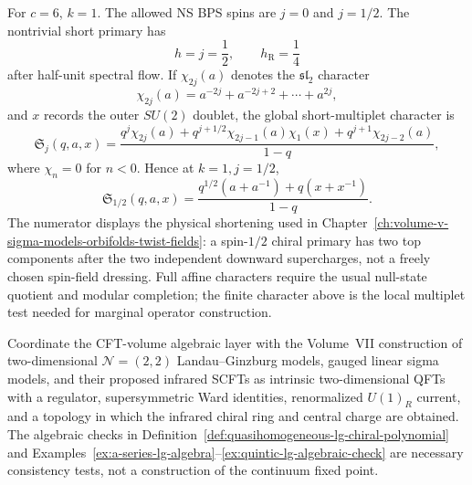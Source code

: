 \begin{example}[\(c=6\) short multiplet character]
\label{ex:small-n4-c6-short-character}
For \(c=6\), \(k=1\).  The allowed NS BPS spins are \(j=0\) and
\(j=1/2\).  The nontrivial short primary has
\[
  h=j=\frac12,
  \qquad
  h_{\mathrm R}=\frac14
\]
after half-unit spectral flow.  If \(\chi_{2j}(a)\) denotes the
\(\mathfrak{sl}_2\) character
\[
  \chi_{2j}(a)=a^{-2j}+a^{-2j+2}+\cdots+a^{2j},
\]
and \(x\) records the outer \(SU(2)\) doublet, the global short-multiplet
character is
\begin{equation}
  \mathfrak S_j(q,a,x)
  =
  \frac{
    q^j\chi_{2j}(a)
    +q^{j+1/2}\chi_{2j-1}(a)\chi_1(x)
    +q^{j+1}\chi_{2j-2}(a)
  }{1-q},
  \label{eq:small-n4-global-short-character}
\end{equation}
where \(\chi_n=0\) for \(n<0\).  Hence at \(k=1,j=1/2\),
\begin{equation}
  \mathfrak S_{1/2}(q,a,x)
  =
  \frac{
    q^{1/2}(a+a^{-1})+q(x+x^{-1})
  }{1-q}.
  \label{eq:small-n4-c6-jhalf-character}
\end{equation}
The numerator displays the physical shortening used in
Chapter~\ref{ch:volume-v-sigma-models-orbifolds-twist-fields}: a
spin-\(1/2\) chiral primary has two top components after the two independent
downward supercharges, not a freely chosen spin-field dressing.  Full affine
characters require the usual null-state quotient and modular completion; the
finite character above is the local multiplet test needed for marginal
operator construction.
\end{example}

\begin{openproblem}
\label{op:intrinsic-2d-supersymmetric-rg-construction}
Coordinate the CFT-volume algebraic layer with the Volume~VII construction of
two-dimensional \(\mathcal N=(2,2)\) Landau--Ginzburg models, gauged linear
sigma models, and their proposed infrared SCFTs as intrinsic two-dimensional
QFTs with a regulator, supersymmetric Ward identities, renormalized
\(U(1)_R\) current, and a topology in which the infrared chiral ring and
central charge are obtained.  The algebraic checks in
Definition~\ref{def:quasihomogeneous-lg-chiral-polynomial} and
Examples~\ref{ex:a-series-lg-algebra}--\ref{ex:quintic-lg-algebraic-check}
are necessary consistency tests, not a construction of the continuum fixed
point.
\end{openproblem}

